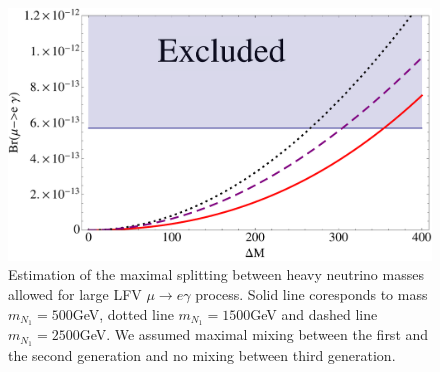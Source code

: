 \documentclass[twocolumn,superscriptaddress,showpacs,prl,nofootinbib,floatfix]{revtex4}
\begin{document}
  \begin{figure}[h!]
  \begin{center}
  \includegraphics[width=\columnwidth]{Plot1}
  \caption{\label{meg1}
Estimation of the maximal splitting between heavy neutrino
    masses allowed for large LFV $\mu \to e \gamma$ process.  Solid
    line coresponds to mass $m_{N_1}=500$GeV, dotted line
    $m_{N_1}=1500$GeV and dashed line $m_{N_1}=2500$GeV. We assumed
    maximal mixing between the first and the second generation and no mixing
    between third generation. 
  }
  \end{center}
  \end{figure}
  


\end{document}
